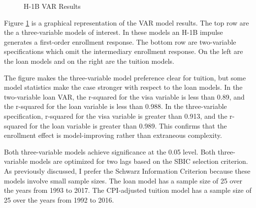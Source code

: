 \documentclass[review]{elsarticle}
\begin{document}
\begin{figure}[h!]
    \centering
    \caption{H-1B VAR Results}
    \label{fig:var_results}
\end{figure}

Figure \ref{fig:var_results} is a graphical representation of the VAR model results.
The top row are the a three-variable models of interest.
In these models an H-1B impulse generates a first-order enrollment response.
The bottom row are two-variable specifications which omit the intermediary enrollment response.
On the left are the loan models and on the right are the tuition models.

The figure makes the three-variable model preference clear for tuition,
but some model statistics make the case stronger with respect to the loan models.
In the two-variable loan VAR, the r-squared for the visa variable is less than 0.89,
and the r-squared for the loan variable is less than 0.988.
In the three-variable specification, r-squared for the visa variable is greater than 0.913,
and the r-squared for the loan variable is greater than 0.989.
This confirms that the enrollment effect is model-improving rather than extraneous complexity.

Both three-variable models achieve significance at the 0.05 level.
Both three-variable models are optimized for two lags based on the SBIC selection criterion.
As previously discussed, I prefer the Schwarz Information Criterion because these models involve small sample sizes.
The loan model has a sample size of 25 over the years from 1993 to 2017.
The CPI-adjusted tuition model has a sample size of 25 over the years from 1992 to 2016.
\end{document}
